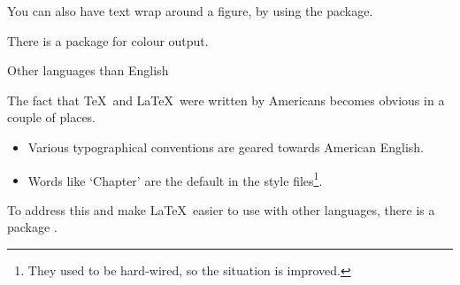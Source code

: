 You can also have text wrap around a figure, by using the 
package.

There is a package  for colour output.

 {Other languages than English}
\label{sec:babel}

The fact that \TeX\ and \LaTeX\ were written by Americans becomes
obvious in a couple of places.
\begin{itemize}
\item Various typographical conventions are geared towards American
  English.
\item Words like `Chapter' are the default in the style
  files\footnote{They used to be hard-wired, so the situation is
    improved.}.
\end{itemize}
To address this and make \LaTeX\ easier to use with other languages,
there is a package .
